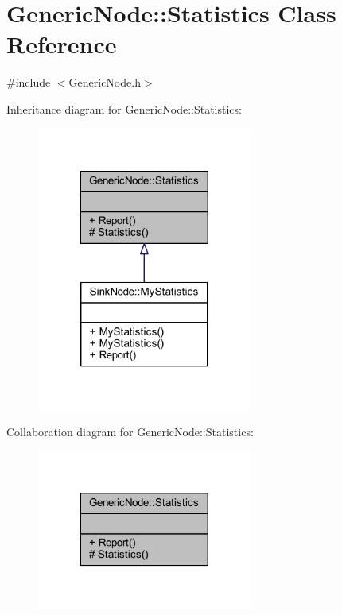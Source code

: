 \hypertarget{class_generic_node_1_1_statistics}{}\section{Generic\+Node\+:\+:Statistics Class Reference}
\label{class_generic_node_1_1_statistics}


{\ttfamily \#include $<$Generic\+Node.\+h$>$}



Inheritance diagram for Generic\+Node\+:\+:Statistics\+:
\nopagebreak
\begin{figure}[H]
\begin{center}
\leavevmode
\includegraphics[width=200pt]{class_generic_node_1_1_statistics__inherit__graph}
\end{center}
\end{figure}


Collaboration diagram for Generic\+Node\+:\+:Statistics\+:
\nopagebreak
\begin{figure}[H]
\begin{center}
\leavevmode
\includegraphics[width=200pt]{class_generic_node_1_1_statistics__coll__graph}
\end{center}
\end{figure}
